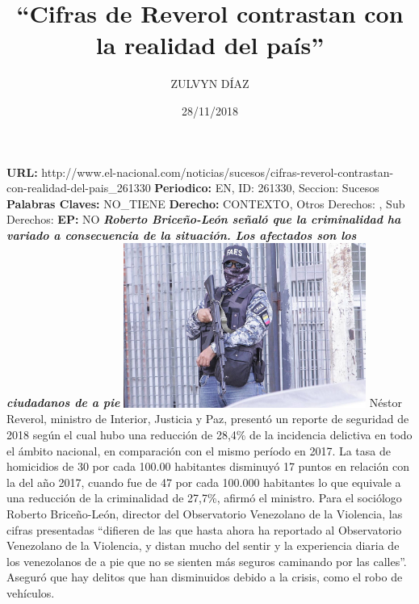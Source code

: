 \documentclass{article}%
\title{\textbf{“Cifras de Reverol contrastan con la realidad del país”}}%
\author{ZULVYN DÍAZ}%
\date{28/11/2018}%
\begin{document}
%
\normalsize%
\maketitle%
\textbf{URL: }%
http://www.el{-}nacional.com/noticias/sucesos/cifras{-}reverol{-}contrastan{-}con{-}realidad{-}del{-}pais\_261330\newline%
%
\textbf{Periodico: }%
EN, %
ID: %
261330, %
Seccion: %
Sucesos\newline%
%
\textbf{Palabras Claves: }%
NO\_TIENE\newline%
%
\textbf{Derecho: }%
CONTEXTO, %
Otros Derechos: %
, %
Sub Derechos: %
\newline%
%
\textbf{EP: }%
NO\newline%
\newline%
%
\textbf{\textit{Roberto Briceño{-}León señaló que la criminalidad ha variado a consecuencia de la situación. Los afectados son los ciudadanos de a pie}}%
\newline%
\newline%
%
\includegraphics[width=300px]{242.jpg}%
\newline%
%
Néstor Reverol, ministro de Interior, Justicia y Paz, presentó un reporte de seguridad de 2018 según el cual hubo una reducción de 28,4\% de la incidencia delictiva en todo el ámbito nacional, en comparación con el mismo período en 2017.%
\newline%
%
La tasa de homicidios de 30 por cada 100.00 habitantes disminuyó 17 puntos en relación con la del año 2017, cuando fue de 47 por cada 100.000 habitantes lo que equivale a una reducción de la criminalidad de 27,7\%, afirmó el ministro.%
\newline%
%
Para el sociólogo Roberto Briceño{-}León, director del Observatorio Venezolano de la Violencia, las cifras presentadas “difieren de las que hasta ahora ha reportado al Observatorio Venezolano de la Violencia, y distan mucho del sentir y la experiencia diaria de los venezolanos de a pie que no se sienten más seguros caminando por las calles”. Aseguró que hay delitos que han disminuidos debido a la crisis, como el robo de vehículos.%
\end{document}
